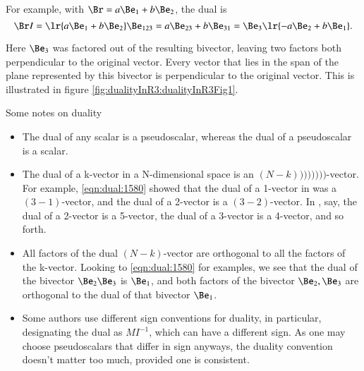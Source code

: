 For example, with \( \Br = a \Be_1 + b \Be_2 \), the dual is
\begin{dmath}\label{eqn:dual:1640}
\Br I
=
\lr{ a \Be_1 + b \Be_2 } \Be_{123}
=
a \Be_{23} + b \Be_{31}
=
\Be_3 \lr{ -a \Be_{2} + b \Be_{1} }.
\end{dmath}

Here \( \Be_3 \) was factored out of the resulting bivector, leaving two factors both perpendicular to the original vector.  Every vector that lies in the span of the plane represented by this bivector is perpendicular to the original vector.
This is illustrated in figure \cref{fig:dualityInR3:dualityInR3Fig1}.



Some notes on duality

\begin{itemize}
\item The dual of any scalar is a pseudoscalar, whereas the dual of a pseudoscalar is a scalar.
\item The dual of a k-vector in a N-dimensional space is an \((N-k))))))))\)-vector.
For example, \cref{eqn:dual:1580} showed that the dual of a 1-vector in  was a \((3-1)\)-vector, and the dual of a 2-vector is a \((3-2)\)-vector.  In , say, the dual of a 2-vector is a 5-vector, the dual of a 3-vector is a 4-vector, and so forth.
\item All factors of the dual \((N-k)\)-vector are orthogonal to all the factors of the k-vector.  Looking to \cref{eqn:dual:1580} for examples, we see that the dual of the bivector \( \Be_2 \Be_3 \) is \( \Be_1 \), and both factors of the bivector \( \Be_2, \Be_3 \) are orthogonal to the dual of that bivector \( \Be_1 \).
\item Some authors use different sign conventions for duality, in particular, designating the dual as \( M I^{-1} \), which can have a different sign.  As one may choose pseudoscalars that differ in sign anyways, the duality convention doesn't matter too much, provided one is consistent.
\end{itemize}

